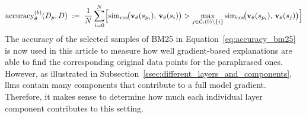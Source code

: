 \begin{equation}
\operatorname{accuracy}^{(b)}_{\theta}(D_{p},D)
\;:=\;
\frac{1}{N}\sum_{i=0}^{N}
\Bigl[
  \operatorname{sim}_{\cos}\!\bigl(\mathbf{v}_{\theta}(s_{p_i}),\,\mathbf{v}_{\theta}(s_i)\bigr)
  >
  \max_{j\in\mathcal{C}_{i}(b)\setminus\{i\}}
  \operatorname{sim}_{\cos}\!\bigl(\mathbf{v}_{\theta}(s_{p_i}),\,\mathbf{v}_{\theta}(s_j)\bigr)
\Bigr]
\label{eq:accuracy_bm25}
\end{equation}
The accuracy of the selected samples of BM25 in Equation~\ref{eq:accuracy_bm25} is now used in this article to measure how well gradient-based explanations are able to find the corresponding original data points for the paraphrased ones. However, as illustrated in Subsection~\ref{ssec:different_layers_and_components}, \acrshort{llm}s contain many components that contribute to a full model gradient. Therefore, it makes sense to determine how much each individual layer component contributes to this setting. 

